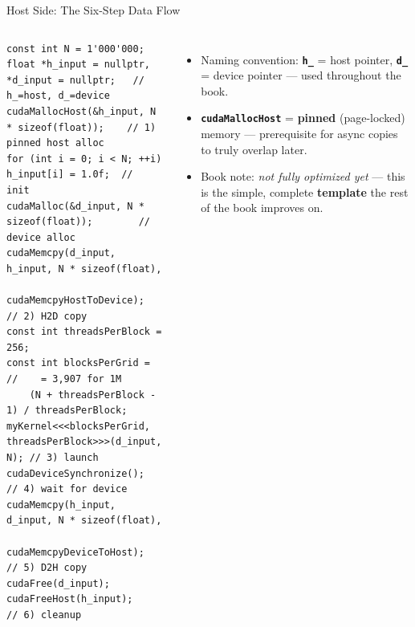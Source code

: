 \documentclass[aspectratio=169]{beamer}
\newcommand{\kw}[1]{\textbf{\textcolor{kwblue}{#1}}}
\begin{document}
\begin{frame}[fragile]{Host Side: The Six-Step Data Flow}
  \begin{columns}[t]
\begin{lstlisting}
const int N = 1'000'000;
float *h_input = nullptr, *d_input = nullptr;   // h_=host, d_=device
cudaMallocHost(&h_input, N * sizeof(float));    // 1) pinned host alloc
for (int i = 0; i < N; ++i) h_input[i] = 1.0f;  //    init
cudaMalloc(&d_input, N * sizeof(float));        //    device alloc
cudaMemcpy(d_input, h_input, N * sizeof(float),
           cudaMemcpyHostToDevice);             // 2) H2D copy
const int threadsPerBlock = 256;
const int blocksPerGrid =                       //    = 3,907 for 1M
    (N + threadsPerBlock - 1) / threadsPerBlock;
myKernel<<<blocksPerGrid, threadsPerBlock>>>(d_input, N); // 3) launch
cudaDeviceSynchronize();                        // 4) wait for device
cudaMemcpy(h_input, d_input, N * sizeof(float),
           cudaMemcpyDeviceToHost);             // 5) D2H copy
cudaFree(d_input); cudaFreeHost(h_input);       // 6) cleanup
\end{lstlisting}
    \begin{itemize}
      \item Naming convention: \kw{\texttt{h\_}} = host pointer, \kw{\texttt{d\_}} = device pointer
            --- used throughout the book.
      \item \kw{\texttt{cudaMallocHost}} = \kw{pinned} (page-locked) memory ---
            prerequisite for async copies to truly overlap later.
      \item Book note: \emph{not fully optimized yet} --- this is the simple, complete
            \kw{template} the rest of the book improves on.
    \end{itemize}
  \end{columns}
\end{frame}
\end{document}
